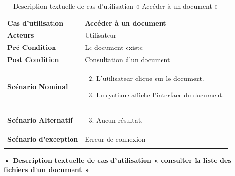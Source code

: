 \begin{longtable}{|p{5cm}|p{10cm}|}
\hline
\textbf{Cas d'utilisation}&Accéder à un document\\
\hline
\textbf{Acteurs}&Utilisateur\\
\hline
\textbf{Pré Condition}&Le document existe\\
\hline
\textbf{Post Condition}&Consultation d'un document\\
\hline
\textbf{Scénario Nominal}&
\vspace{-\baselineskip}
\begin{enumerate}
    \setcounter{enumi}{1}
    \item L'utilisateur clique sur le document.
    \item Le système affiche l'interface de document.
    
\end{enumerate}\\
\hline
\textbf{Scénario Alternatif}&
\vspace{-\baselineskip}
\begin{enumerate}
    \setcounter{enumi}{2}
    \item Aucun résultat.
\end{enumerate}\\
\hline
\textbf{Scénario d'exception}&Erreur de connexion\\
\hline
\caption{Description textuelle de cas d'utilisation « Accéder à un document »}
\label{tab:DescriptionTextuelleDeCasDUtilisationAccéderAUnDocument}
\end{longtable}


\textbf{•	Description textuelle de cas d'utilisation « consulter la liste des fichiers d'un document »}

